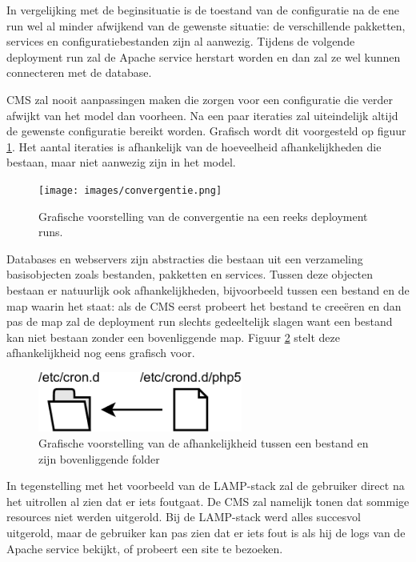 In vergelijking met de beginsituatie is de toestand van de configuratie na de ene run wel al minder afwijkend van de gewenste situatie:
de verschillende pakketten, services en configuratiebestanden zijn al aanwezig.
Tijdens de volgende deployment run zal de Apache service herstart worden en dan zal ze wel kunnen connecteren met de database.

CMS zal nooit aanpassingen maken die zorgen voor een configuratie die verder afwijkt van het model dan voorheen.
Na een paar iteraties zal uiteindelijk altijd de gewenste configuratie bereikt worden. 
Grafisch wordt dit voorgesteld op figuur \ref{fig:convergentie}.
Het aantal iteraties is afhankelijk van de hoeveelheid afhankelijkheden die bestaan, maar niet aanwezig zijn in het model.

\begin{figure}
    \begin{center}
    \texttt{[image: images/convergentie.png]}
    \caption{Grafische voorstelling van de convergentie na een reeks deployment runs.}
    \label{fig:convergentie}
    \end{center}
\end{figure}

Databases en webservers zijn abstracties die bestaan uit een verzameling basisobjecten zoals bestanden, pakketten en services.
Tussen deze objecten bestaan er natuurlijk ook afhankelijkheden, bijvoorbeeld tussen een bestand en de map waarin het staat:
als de CMS eerst probeert het bestand te cree\"eren en dan pas de map zal de deployment run slechts gedeeltelijk slagen want een bestand kan niet bestaan
zonder een bovenliggende map.
Figuur \ref{fig:file_dir_dep} stelt deze afhankelijkheid nog eens grafisch voor.
\begin{figure}
    \begin{center}
    \includegraphics[width=0.6\textwidth]{images/file_dir_dep.pdf}
    \caption{Grafische voorstelling van de afhankelijkheid tussen een bestand en zijn bovenliggende folder}
    \label{fig:file_dir_dep}
    \end{center}
\end{figure}
In tegenstelling met het voorbeeld van de LAMP-stack zal de gebruiker direct na het uitrollen al zien dat er iets foutgaat.
De CMS zal namelijk tonen dat sommige resources niet werden uitgerold.
Bij de LAMP-stack werd alles succesvol uitgerold, maar de gebruiker kan pas zien dat er iets fout is als hij de logs van de Apache service bekijkt, of probeert een site te bezoeken.

